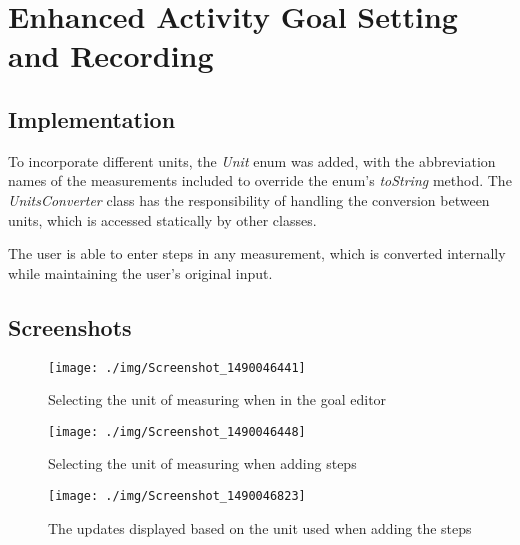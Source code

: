 \documentclass[report.tex]{subfiles}
\begin{document}
\section{Enhanced Activity Goal Setting and Recording} %
\label{sec:enhanced_activity_goal_setting_and_recording}
\subsection{Implementation} %
\label{sub:implementation_4}
To incorporate different units, the \emph{Unit} enum was added, with the
abbreviation names of the measurements included to override the enum's 
\emph{toString} method. The \emph{UnitsConverter} class has the responsibility
of handling the conversion between units, which is accessed statically by other
classes.

The user is able to enter steps in any measurement, which is converted
internally while maintaining the user's original input.

\subsection{Screenshots} %
\label{sub:screenshots_4}
\begin{figure}[H]
    \centering
    \texttt{[image: ./img/Screenshot\_1490046441]}
    \caption{Selecting the unit of measuring when in the goal editor}
\end{figure}

\begin{figure}[H]
    \centering
    \texttt{[image: ./img/Screenshot\_1490046448]}
    \caption{Selecting the unit of measuring when adding steps}
\end{figure}

\begin{figure}[H]
    \centering
    \texttt{[image: ./img/Screenshot\_1490046823]}
    \caption{The updates displayed based on the unit used when adding the steps}
\end{figure}

\newpage
\end{document}
